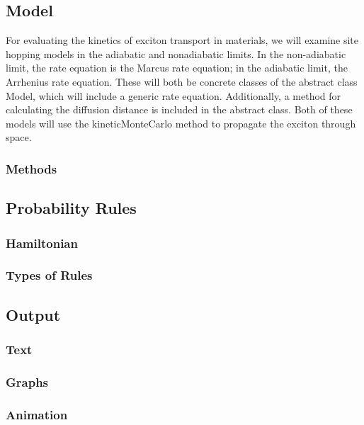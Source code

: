 \documentclass{article}
\begin{document}
\subsection{Model}

For evaluating the kinetics of exciton transport in materials, we will examine site hopping models in the adiabatic and nonadiabatic limits. In the non-adiabatic limit, the rate equation is the Marcus rate equation; in the adiabatic limit, the Arrhenius rate equation. These will both be concrete classes of the abstract class Model, which will include a generic rate equation. Additionally, a method for calculating the diffusion distance is included in the abstract class. Both of these models will use the kineticMonteCarlo method to propagate the exciton through space.

\subsubsection{Methods}

\subsection{Probability Rules}

\subsubsection{Hamiltonian}



\subsubsection{Types of Rules}


\subsection{Output}

\subsubsection{Text}

\subsubsection{Graphs}

\subsubsection{Animation}
\end{document}
